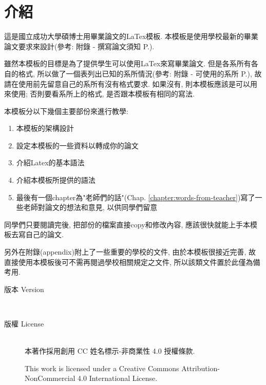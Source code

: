 
\section{介紹}

這是國立成功大學碩博士用畢業論文的LaTex模板. 本模板是使用學校最新的畢業論文要求來設計(參考: 附錄 - 撰寫論文須知 P.\pageref{appendix:thesis-spec}).

雖然本模板的目標是為了提供學生可以使用LaTex來寫畢業論文. 但是各系所有各自的格式, 所以做了一個表列出已知的系所情況(參考: 附錄 - 可使用的系所 P.\pageref{appendix:acceptable-dept}), 故請在使用前先留意自己的系所有沒有格式要求. 如果沒有, 則本模板應該是可以用來使用; 否則要看系所上的格式, 是否跟本模板有相同的寫法.

本模板分以下幾個主要部份來進行教學:
\begin{enumerate}
  \item 本模板的架構設計
  \item 設定本模板的一些資料以轉成你的論文
  \item 介紹Latex的基本語法
  \item 介紹本模板所提供的語法
  \item 最後有一個chapter為"老師們的話"(Chap. \ref{chapter:words-from-teacher})寫了一些老師對論文的想法和意見, 以供同學們留意
\end{enumerate}
同學們只要閱讀完後, 把部份的檔案直接copy和修改內容, 應該很快就能上手本模板去寫自己的論文.

另外在附錄(appendix)附上了一些重要的學校的文件, 由於本模板很接近完善, 故直接使用本模板後可不需再閱過學校相關規定之文件, 所以該類文件置於此僅為備考用.


\begin{description}
  \item[版本 Version] \hfill \\
    \ThisThesisVersion

  \item[版權 License] \hfill \\
    本著作採用創用 CC 姓名標示-非商業性 4.0 授權條款.

    This work is licensed under a Creative Commons Attribution-NonCommercial 4.0 International License.

\end{description}

\EndChapter
